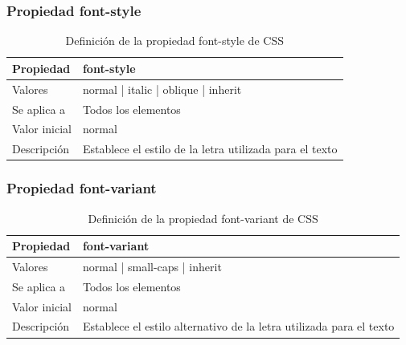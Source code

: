 \begin{frame}
\frametitle{Propiedad font-style}

\begin{center}
  \begin{table}
   \begin{tabular}{p{1.8cm}p{7.8cm}}
Propiedad & \bf{font-style} \\ \hline
Valores& normal | italic | oblique | inherit \\ \hline
Se aplica a& Todos los elementos \\ \hline
Valor inicial& normal \\ \hline
Descripción& Establece el estilo de la letra utilizada para el texto \\ \hline
  \end{tabular}
   \caption{Definición de la propiedad font-style de CSS}
 \end{table}
\end{center}

\end{frame}



\begin{frame}
\frametitle{Propiedad font-variant}

\begin{center}
  \begin{table}
   \begin{tabular}{p{1.8cm}p{7.8cm}}
Propiedad & \bf{font-variant} \\ \hline
Valores& normal | small-caps | inherit \\ \hline
Se aplica a& Todos los elementos \\ \hline
Valor inicial& normal \\ \hline
Descripción& Establece el estilo alternativo de la letra utilizada para el texto \\ \hline
  \end{tabular}
   \caption{Definición de la propiedad font-variant de CSS}
 \end{table}
\end{center}


\end{frame}



